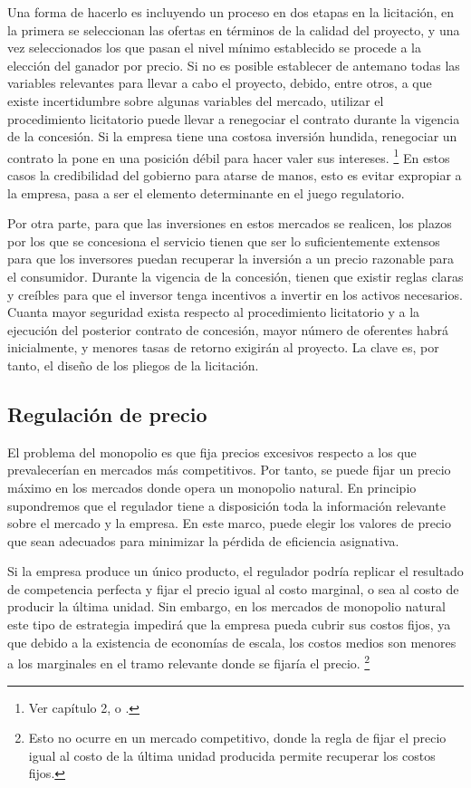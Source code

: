 \documentclass[
  12pt,
  spanish,
]{book}
\begin{document}
Una forma de hacerlo es incluyendo un proceso en dos etapas en la
licitación, en la primera se seleccionan las ofertas en términos de la
calidad del proyecto, y una vez seleccionados los que pasan el nivel
mínimo establecido se procede a la elección del ganador por precio. Si
no es posible establecer de antemano todas las variables relevantes para
llevar a cabo el proyecto, debido, entre otros, a que existe
incertidumbre sobre algunas variables del mercado, utilizar el
procedimiento licitatorio puede llevar a renegociar el contrato durante
la vigencia de la concesión. Si la empresa tiene una costosa inversión
hundida, renegociar un contrato la pone en una posición débil para hacer
valer sus intereses. \footnote{Ver \citet{Bergara2003} capítulo 2, o
  \citet{Williamson1998}.} En estos casos la credibilidad del gobierno
para atarse de manos, esto es evitar expropiar a la empresa, pasa a ser
el elemento determinante en el juego regulatorio.

Por otra parte, para que las inversiones en estos mercados se realicen,
los plazos por los que se concesiona el servicio tienen que ser lo
suficientemente extensos para que los inversores puedan recuperar la
inversión a un precio razonable para el consumidor. Durante la vigencia
de la concesión, tienen que existir reglas claras y creíbles para que el
inversor tenga incentivos a invertir en los activos necesarios. Cuanta
mayor seguridad exista respecto al procedimiento licitatorio y a la
ejecución del posterior contrato de concesión, mayor número de oferentes
habrá inicialmente, y menores tasas de retorno exigirán al proyecto. La
clave es, por tanto, el diseño de los pliegos de la licitación.

\hypertarget{regulaciuxf3n-de-precio}{%
\subsection{Regulación de precio}\label{regulaciuxf3n-de-precio}}

El problema del monopolio es que fija precios excesivos respecto a los
que prevalecerían en mercados más competitivos. Por tanto, se puede
fijar un precio máximo en los mercados donde opera un monopolio natural.
En principio supondremos que el regulador tiene a disposición toda la
información relevante sobre el mercado y la empresa. En este marco,
puede elegir los valores de precio que sean adecuados para minimizar la
pérdida de eficiencia asignativa.

Si la empresa produce un único producto, el regulador podría replicar el
resultado de competencia perfecta y fijar el precio igual al costo
marginal, o sea al costo de producir la última unidad. Sin embargo, en
los mercados de monopolio natural este tipo de estrategia impedirá que
la empresa pueda cubrir sus costos fijos, ya que debido a la existencia
de economías de escala, los costos medios son menores a los marginales
en el tramo relevante donde se fijaría el precio. \footnote{Esto no
  ocurre en un mercado competitivo, donde la regla de fijar el precio
  igual al costo de la última unidad producida permite recuperar los
  costos fijos.}
\end{document}
